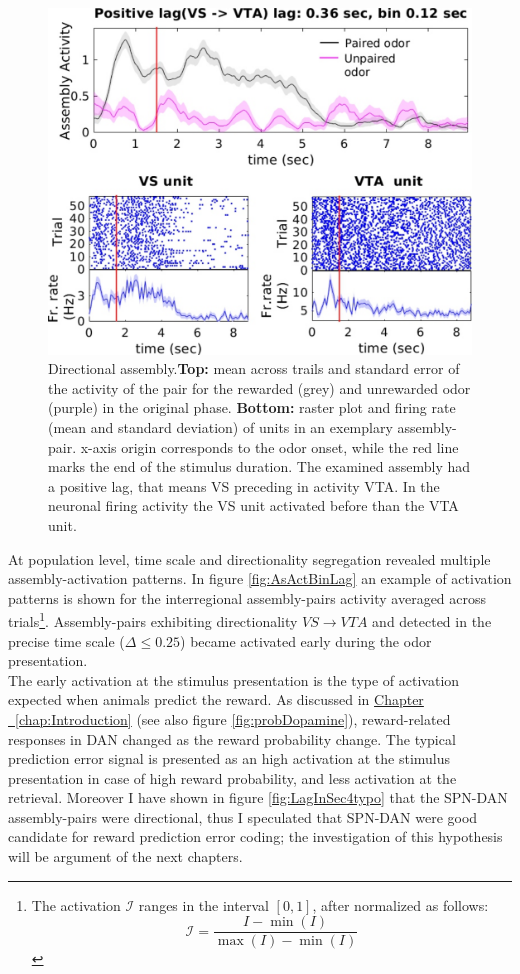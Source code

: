 \begin{figure}
    \centering
    \includegraphics[scale=0.55]{figures/DirectionalAsEx1.pdf}
    \caption{Directional assembly.\textbf{Top:} mean across trails and standard error of the activity of the pair for the rewarded (grey) and unrewarded odor (purple) in the original phase. \textbf{Bottom:} raster plot and firing rate (mean and standard deviation) of units in an exemplary assembly-pair. x-axis origin corresponds to the odor onset, while the red line marks the end of the stimulus duration. The examined assembly had a positive lag, that means VS preceding in activity VTA. In the neuronal firing activity the VS unit activated before than the VTA unit.}
    \label{fig:directional_assembly}
\end{figure}
At population level, time scale and directionality segregation revealed multiple assembly-activation patterns. In figure \ref{fig:AsActBinLag} an example of activation patterns is shown for the interregional assembly-pairs activity averaged across trials\footnote{The activation $\mathcal{I}$ ranges in the interval $[0,1]$, after normalized as follows:
\begin{equation}
    \mathcal{I} = \frac{I-\min(I)}{\max(I)-\min(I)}
    \label{eq:norm}
\end{equation}}. 
Assembly-pairs exhibiting directionality $VS \rightarrow VTA$ and detected in the precise time scale ($\Delta \le 0.25$) became activated early during the odor presentation.\\The early activation at the stimulus presentation is the type of activation expected when animals predict the reward. As discussed in \hyperref[chap:Introduction]{Chapter ~\ref*{chap:Introduction}} (see also figure \ref{fig:probDopamine}), reward-related responses in DAN changed as the reward probability change. The typical prediction error signal is presented as an high activation at the stimulus presentation in case of high reward probability, and less activation at the retrieval. Moreover I have shown in figure \ref{fig:LagInSec4typo} that the SPN-DAN assembly-pairs were directional, thus I speculated that SPN-DAN were good candidate for reward prediction error coding; the investigation of this hypothesis will be argument of the next chapters.\\
